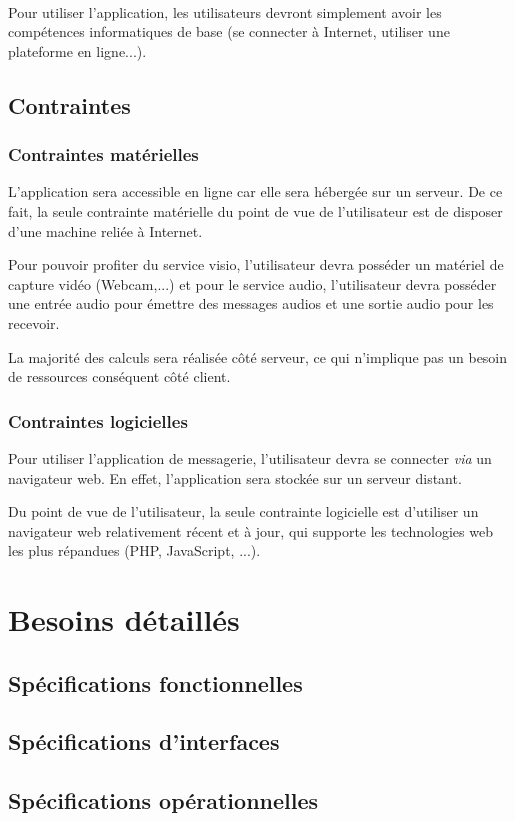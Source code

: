 \documentclass[11pt,dvipsnames,svgnames]{report}
\begin{document}
~\\\indent
Pour utiliser l'application, les utilisateurs devront simplement avoir les compétences informatiques de base (se connecter à Internet, utiliser une plateforme en ligne...).

\section{Contraintes}
\subsection{Contraintes matérielles}
L'application sera accessible en ligne car elle sera hébergée sur un serveur. De ce fait, la seule contrainte matérielle du point de vue de l'utilisateur est de disposer d'une machine reliée à Internet. 

Pour pouvoir profiter du service visio, l'utilisateur devra posséder un matériel de capture vidéo (Webcam,...) et pour le service audio, l'utilisateur devra posséder une entrée audio pour émettre des messages audios et une sortie audio pour les recevoir.


La majorité des calculs sera réalisée côté serveur, ce qui n'implique pas un besoin de ressources conséquent côté client.

\subsection{Contraintes logicielles}
Pour utiliser l'application de messagerie, l'utilisateur devra se connecter \emph{via} un navigateur web. En effet, l'application sera stockée sur un serveur distant. 

Du point de vue de l'utilisateur, la seule contrainte logicielle est d'utiliser un navigateur web relativement récent et à jour, qui supporte les technologies web les plus répandues (PHP, JavaScript, ...).


\chapter{Besoins détaillés}
\section{Spécifications fonctionnelles}

\section{Spécifications d'interfaces}

\section{Spécifications opérationnelles}
\end{document}
